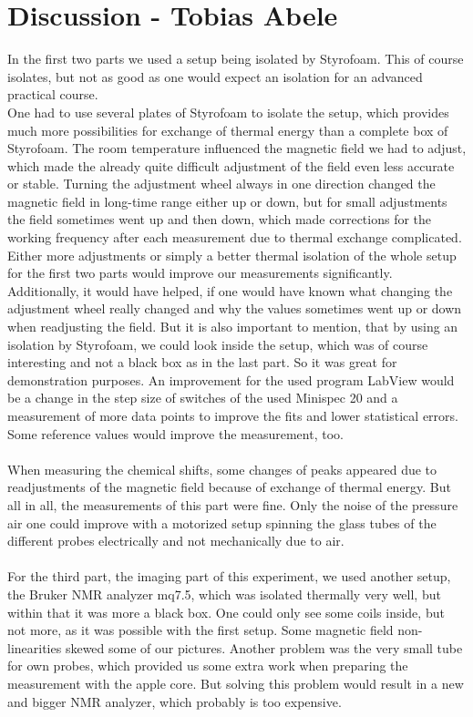 \section{Discussion - Tobias Abele}
In the first two parts we used a setup being isolated by Styrofoam. This of course isolates, but not as good as one would expect an isolation for an advanced practical course.\\
One had to use several plates of Styrofoam to isolate the setup, which provides much more possibilities for exchange of thermal energy than a complete box of Styrofoam. The room temperature influenced the magnetic field we had to adjust, which made the already quite difficult adjustment of the field even less accurate or stable. Turning the adjustment wheel always in one direction changed the magnetic field in long-time range either up or down, but for small adjustments the field sometimes went up and then down, which made corrections for the working frequency after each measurement due to thermal exchange complicated.
Either more adjustments or simply a better thermal isolation of the whole setup for the first two parts would improve our measurements significantly. Additionally, it would have helped, if one would have known what changing the adjustment wheel really changed and why the values sometimes went up or down when readjusting the field.
But it is also important to mention, that by using an isolation by Styrofoam, we could look inside the setup, which was of course interesting and not a black box as in the last part. So it was great for demonstration purposes.
An improvement for the used program LabView would be a change in the step size of switches of the used Minispec 20 and a measurement of more data points to improve the fits and lower statistical errors.\\
Some reference values would improve the measurement, too.\\
\\
\noindent
When measuring the chemical shifts, some changes of peaks appeared due to readjustments of the magnetic field because of exchange of thermal energy. But all in all, the measurements of this part were fine. Only the noise of the pressure air one could improve with a motorized setup spinning the glass tubes of the different probes electrically and not mechanically due to air.\\
\\
For the third part, the imaging part of this experiment, we used another setup, the Bruker NMR analyzer mq7.5, which was isolated thermally very well, but within that it was more a black box. One could only see some coils inside, but not more, as it was possible with the first setup. Some magnetic field non-linearities skewed some of our pictures. Another problem was the very small tube for own probes, which provided us some extra work when preparing the measurement with the apple core. But solving this problem would result in a new and bigger NMR analyzer, which probably is too expensive. 
